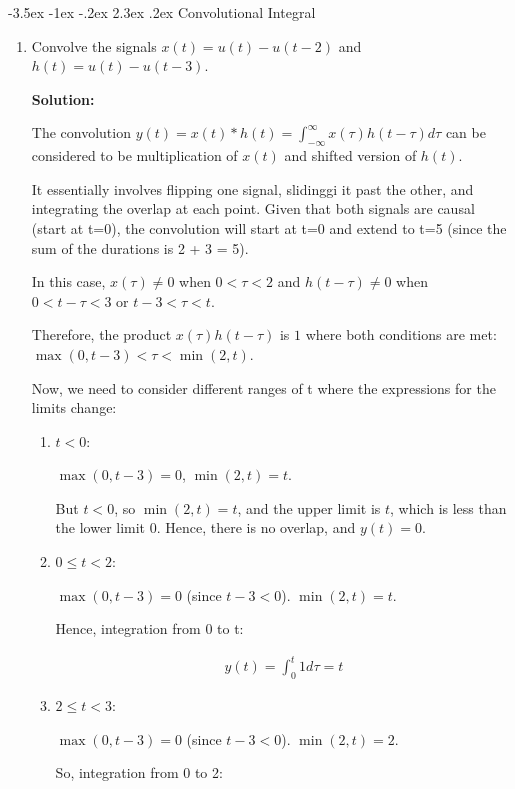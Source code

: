 \documentclass[nohyper,nobib,xcolor=dvipsnames,svgnames,x11names]{tufte-book}
\makeatletter
\newenvironment{multiequation}{%
  \setlength{\abovedisplayskip}{3pt}      %
  \setlength{\belowdisplayskip}{6pt}      %
  \setlength{\abovedisplayshortskip}{3pt} %
  \setlength{\belowdisplayshortskip}{6pt} %
  \begin{equation}%
    \begin{aligned}%
}{%
    \end{aligned}%
  \end{equation}%
}
\renewcommand\section{\@startsection{section}{1}{\z@}%
                     {-3.5ex \@plus -1ex \@minus -.2ex}%
                     {2.3ex \@plus.2ex}%
                     {\normalfont\Large\bfseries\color{darkorange}}}
\makeatother
\begin{document}
\section{Convolutional Integral}

\begin{enumerate}
\item Convolve the signals $x(t) = u(t) - u(t-2)$ and $h(t) = u(t) - u(t-3)$.

\textbf{Solution:}

The convolution $y(t) = x(t)*h(t) = \int_{-\infty}^{\infty} x(\tau)h(t-\tau)d\tau$ can be considered to be multiplication of $x(t)$ and shifted version of $h(t)$.

It essentially involves flipping one signal, slidinggi it past the other, and integrating the overlap at each point. Given that both signals are causal (start at t=0), the convolution will start at t=0 and extend to t=5 (since the sum of the durations is 2 + 3 = 5).

In this case, $x(\tau) \neq 0 $ when $0<\tau<2$ and $h(t-\tau) \neq 0$ when $0<t-\tau<3$ or $ t - 3 < \tau < t$.

Therefore, the product $x(\tau) h(t - \tau)$ is $1$ where both conditions are met: $\max(0,t-3)<\tau<\min(2,t)$.

Now, we need to consider different ranges of t where the expressions for the limits change:

\begin{enumerate}
\item $t < 0$:


$\max(0,t - 3)=0$, $\min(2,t)=t$.

But $t < 0$, so $\min(2,t)=t$, and the upper limit is $t$, which is less than the lower limit $0$. Hence, there is no overlap, and $y(t) = 0$.

\item $0 \leq t < 2$:

$\max(0,t-3)=0$ (since $t-3 < 0$). $\min(2,t)=t$. 

Hence, integration from 0 to t:

\begin{multiequation}
y(t) = \int_0^t 1 d\tau = t
\end{multiequation}


\item $2\leq t<3$:

$\max(0,t-3)=0$ (since $t-3 < 0$).  $\min(2,t)=2$.

So, integration from 0 to 2:


\end{enumerate}
\end{enumerate}
\end{document}
